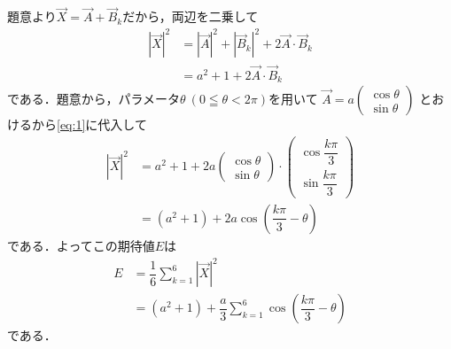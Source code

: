 \documentclass[../../main.tex]{subfiles}
\begin{document}
題意より$\vec{X}=\vec{A}+\vec{B}_k$だから，両辺を二乗して
\begin{align}
  |\vec{X}|^2
  &= |\vec{A}|^2 + |\vec{B}_k|^2 + 2\vec{A} \cdot \vec{B}_k \\
  &= a^2 + 1 + 2\vec{A} \cdot \vec{B}_k \label{eq:1}
\end{align}
である．題意から，パラメータ$\theta \ (0 \leqq \theta < 2\pi)$を用いて
$\vec{A} = a
\begin{pmatrix} \cos\theta \\ \sin\theta
\end{pmatrix}$
とおけるから\cref{eq:1}に代入して
\begin{align}
  |\vec{X}|^2
  &= a^2+1 + 2a
  \begin{pmatrix} \cos\theta \\ \sin\theta
  \end{pmatrix} \cdot
  \begin{pmatrix} \cos\dfrac{k\pi}{3} \\ \sin\dfrac{k\pi}{3}
  \end{pmatrix}  \\
  &= (a^2+1) + 2a\cos\left(\dfrac{k\pi}{3} - \theta\right) \label{eq:2}
\end{align}
である．よってこの期待値$E$は
\begin{align}
  E
  &= \dfrac{1}{6} \sum_{k=1}^6 |\vec{X}|^2 \\
  &= (a^2+1) + \dfrac{a}{3} \sum_{k=1}^6 \cos\left(\dfrac{k\pi}{3} - \theta\right) \label{eq:3}
\end{align}
である．
\end{document}
